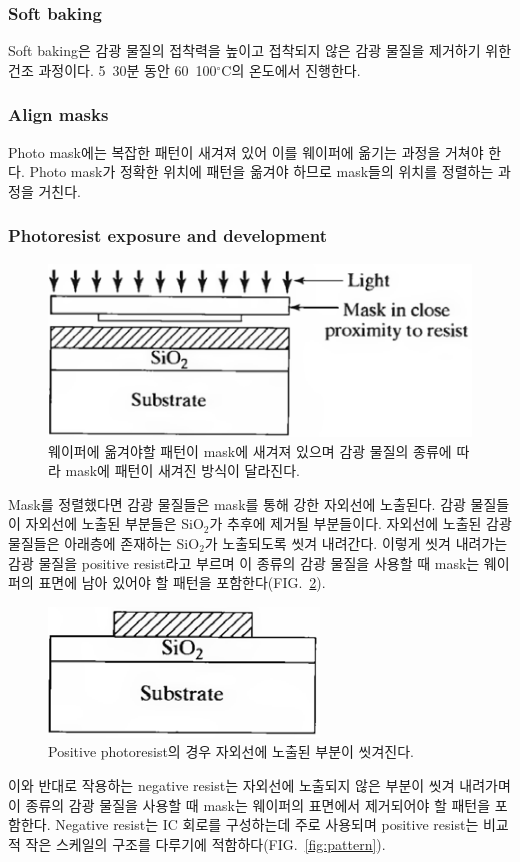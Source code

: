 \documentclass[aps,reprint,superscriptaddress,10pt]{revtex4-2}
\begin{document}
\subsubsection{Soft baking}
Soft baking은 감광 물질의 접착력을 높이고 접착되지 않은 감광 물질을 제거하기 위한 건조 과정이다.
5~30분 동안 60~100$^\circ$C의 온도에서 진행한다.

\subsubsection{Align masks}
Photo mask에는 복잡한 패턴이 새겨져 있어 이를 웨이퍼에 옮기는 과정을 거쳐야 한다. Photo mask가 정확한
위치에 패턴을 옮겨야 하므로 mask들의 위치를 정렬하는 과정을 거친다.

\subsubsection{Photoresist exposure and development}

\begin{figure}[htbp]
\includegraphics[scale=0.4]{c.png}
\caption{웨이퍼에 옮겨야할 패턴이 mask에 새겨져 있으며 감광 물질의 종류에 따라 mask에 패턴이 새겨진
 방식이 달라진다.}
\label{fig:c}
\end{figure}

Mask를 정렬했다면 감광 물질들은 mask를 통해 강한 자외선에 노출된다. 감광 물질들이 자외선에 노출된 부분들은
SiO$_2$가 추후에 제거될 부분들이다. 자외선에 노출된 감광 물질들은 아래층에 존재하는 SiO$_2$가 노출되도록
씻겨 내려간다. 이렇게 씻겨 내려가는 감광 물질을 positive resist라고 부르며 이 종류의 감광 물질을 사용할 때
mask는 웨이퍼의 표면에 남아 있어야 할 패턴을 포함한다(FIG.~\ref{fig:d}). 

\begin{figure}[htbp]
  \centering
  \includegraphics[scale=0.4]{d.png}
  \caption{Positive photoresist의 경우 자외선에 노출된 부분이 씻겨진다.}
    \label{fig:d}
  \end{figure}
이와 반대로 작용하는 negative resist는 자외선에 
노출되지 않은 부분이 씻겨 내려가며 이 종류의 감광 물질을 사용할 때 mask는 웨이퍼의 표면에서 제거되어야 할
패턴을 포함한다. Negative resist는 IC 회로를 구성하는데 주로 사용되며 positive resist는 비교적 작은 스케일의
구조를 다루기에 적함하다(FIG.~\ref{fig:pattern}).
\end{document}
